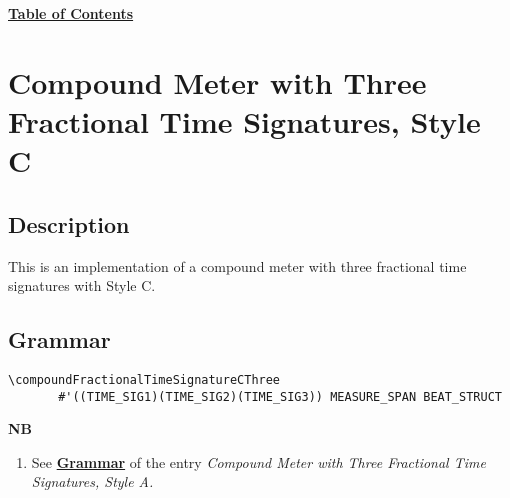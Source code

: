 \hyperref[sec:toc]{\textbf{Table of Contents}}

\vfill \break








\section {Compound Meter with Three Fractional Time Signatures, Style C}

\hfill
{}
\hfill

\subsection{Description}
This is an implementation of a compound meter with three fractional time signatures with Style C.  

\subsection{Grammar}
\begin{verbatim}
\compoundFractionalTimeSignatureCThree
       #'((TIME_SIG1)(TIME_SIG2)(TIME_SIG3)) MEASURE_SPAN BEAT_STRUCT
\end{verbatim}
\textbf{NB}
\begin{enumerate}
\item See \hyperref[sec:compoundfractionalmeter_grammar]{\textbf{Grammar}} of the entry \textit{Compound Meter with Three Fractional Time Signatures, Style A.}
\end{enumerate}

